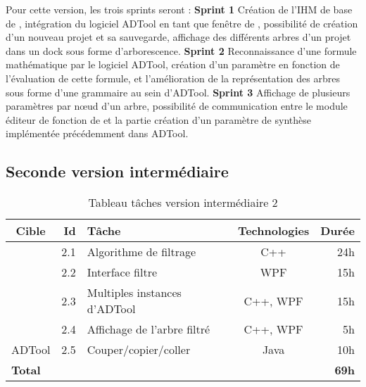 		Pour cette version, les trois sprints seront :\newline
		\textbf{Sprint 1} Création de l'IHM de base de \glasir{}, intégration du logiciel ADTool en tant que fenêtre de \glasir{}, possibilité de création d'un nouveau projet et sa sauvegarde, affichage des différents arbres d'un projet dans un dock sous forme d'arborescence.\newline
		\textbf{Sprint 2} Reconnaissance d'une formule mathématique par le logiciel ADTool, création d'un paramètre en fonction de l'évaluation de cette formule, et l'amélioration de la représentation des arbres sous forme d'une grammaire au sein d'ADTool.\newline
		\textbf{Sprint 3} Affichage de plusieurs paramètres par nœud d'un arbre, possibilité de communication entre le module éditeur de fonction de \glasir{} et la partie création d'un paramètre de synthèse implémentée précédemment dans ADTool.\newline

	\subsection{Seconde version intermédiaire}

		\begin{table}[h]
			\centering
			\begin{tabular}{|c|r|l|c|r|}
				\hline
				\textbf{Cible} & \textbf{Id} & \textbf{Tâche} & \textbf{Technologies} & \textbf{Durée}\\
				\hline

				\multirow{4}{*}{\glasir{}} & 2.1 & Algorithme de filtrage & C++ & 24h\\
				\cline{2-5}
				 & 2.2 & Interface filtre & WPF & 15h\\
				\cline{2-5}
				 & 2.3 & Multiples instances d'ADTool & C++, WPF & 15h\\
				\cline{2-5}
				 & 2.4 & Affichage de l'arbre filtré & C++, WPF & 5h\\
				\hline

				\multirow{1}{*}{ADTool} & 2.5 & Couper/copier/coller & \multirow{1}{*}{Java} & 10h\\
				\hline

				\multicolumn{4}{|l|}{\bf Total} & {\bf 69h}\\
				\hline
			\end{tabular}
			\caption{Tableau tâches version intermédiaire 2}
			\label{fig:taches_units_2}
		\end{table}

